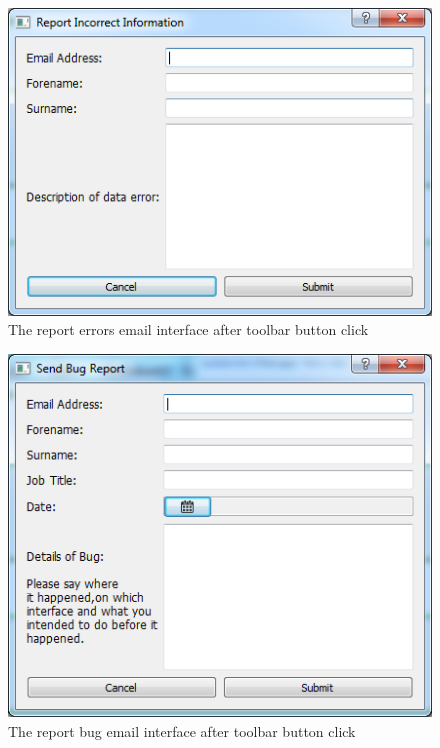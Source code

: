 \begin{figure}[H]
    \includegraphics[width=\textwidth]{./Maintenance/Images/ReportError.png}
    \caption{The report errors email interface after toolbar button click} \label{fig:ReportError}
\end{figure}

\begin{figure}[H]
    \includegraphics[width=\textwidth]{./Maintenance/Images/ReportBug.png}
    \caption{The report bug email interface after toolbar button click} \label{fig:ReportBug}
\end{figure}

